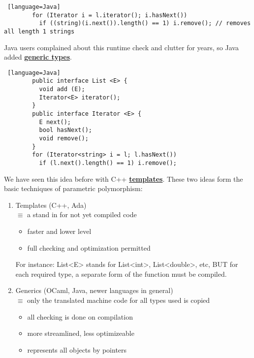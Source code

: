 \documentclass[../../lecture_notes.tex]{subfiles}
\begin{document}
\begin{enumerate} [itemsep=0mm]
\begin{lstlisting} [language=Java]
		for (Iterator i = l.iterator(); i.hasNext())
		  if ((string)(i.next()).length() == 1) i.remove(); // removes all length 1 strings
		\end{lstlisting}
		Java users complained about this runtime check and clutter for years, 
			so Java added \textbf{\underline{generic types}}.
		\begin{lstlisting} [language=Java]
		public interface List <E> {
		  void add (E);
		  Iterator<E> iterator();
		} 
		public interface Iterator <E> {
		  E next();
		  bool hasNext();
		  void remove();
		}
		for (Iterator<string> i = l; l.hasNext())
		  if (l.next().length() == 1) i.remove();
		\end{lstlisting}
		We have seen this idea before with C++ \textbf{\underline{templates}}.
		These two ideas form the basic techniques of parametric polymorphism:
		\begin{enumerate} [itemsep=0mm]
			\item Templates (C++, Ada)\\
				$\equiv$ a stand in for not yet compiled code
				\begin{itemize} [itemsep=0mm]
					\item faster and lower level
					\item full checking and optimization permitted
				\end{itemize}
				For instance: List<E> stands for List<int>, List<double>, etc, 
					BUT for each required type, a separate form of the function must be compiled.
			\item Generics (OCaml, Java, newer languages in general)\\
				$\equiv$ only the translated machine code for all types used is copied
				\begin{itemize} [itemsep=0mm]
					\item all checking is done on compilation
					\item more streamlined, less optimizeable
					\item represents all objects by pointers
				\end{itemize}
		\end{enumerate}
\end{enumerate}
\end{document}
